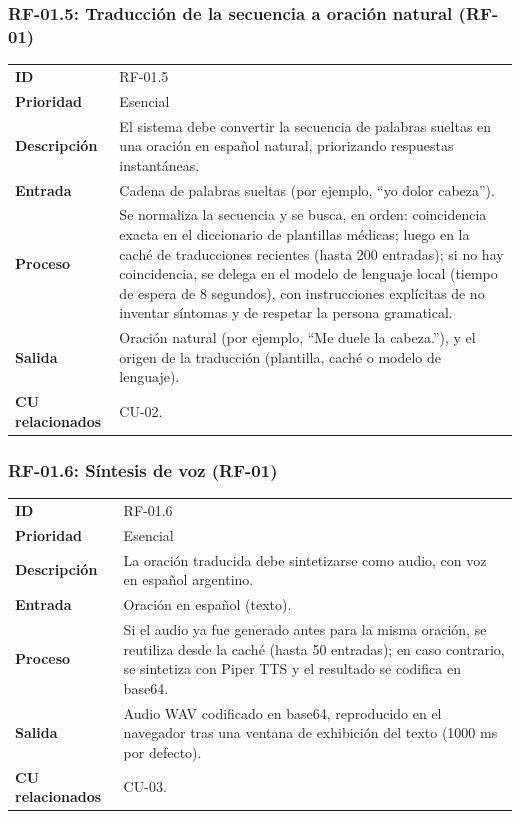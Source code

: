 \subsubsection{RF-01.5: Traducción de la secuencia a oración natural (RF-01)}
\begin{table}[H]
\centering
\begin{tabularx}{\textwidth}{l X}
\toprule
\textbf{ID} & RF-01.5 \\
\textbf{Prioridad} & Esencial \\
\textbf{Descripción} & El sistema debe convertir la secuencia de palabras sueltas en una oración en español natural, priorizando respuestas instantáneas. \\
\textbf{Entrada} & Cadena de palabras sueltas (por ejemplo, ``yo dolor cabeza''). \\
\textbf{Proceso} & Se normaliza la secuencia y se busca, en orden: coincidencia exacta en el diccionario de plantillas médicas; luego en la caché de traducciones recientes (hasta 200 entradas); si no hay coincidencia, se delega en el modelo de lenguaje local (tiempo de espera de 8 segundos), con instrucciones explícitas de no inventar síntomas y de respetar la persona gramatical. \\
\textbf{Salida} & Oración natural (por ejemplo, ``Me duele la cabeza.''), y el origen de la traducción (plantilla, caché o modelo de lenguaje). \\
\textbf{CU relacionados} & CU-02. \\
\bottomrule
\end{tabularx}
\end{table}

\subsubsection{RF-01.6: Síntesis de voz (RF-01)}
\begin{table}[H]
\centering
\begin{tabularx}{\textwidth}{l X}
\toprule
\textbf{ID} & RF-01.6 \\
\textbf{Prioridad} & Esencial \\
\textbf{Descripción} & La oración traducida debe sintetizarse como audio, con voz en español argentino. \\
\textbf{Entrada} & Oración en español (texto). \\
\textbf{Proceso} & Si el audio ya fue generado antes para la misma oración, se reutiliza desde la caché (hasta 50 entradas); en caso contrario, se sintetiza con Piper TTS y el resultado se codifica en base64. \\
\textbf{Salida} & Audio WAV codificado en base64, reproducido en el navegador tras una ventana de exhibición del texto (1000 ms por defecto). \\
\textbf{CU relacionados} & CU-03. \\
\bottomrule
\end{tabularx}
\end{table}


